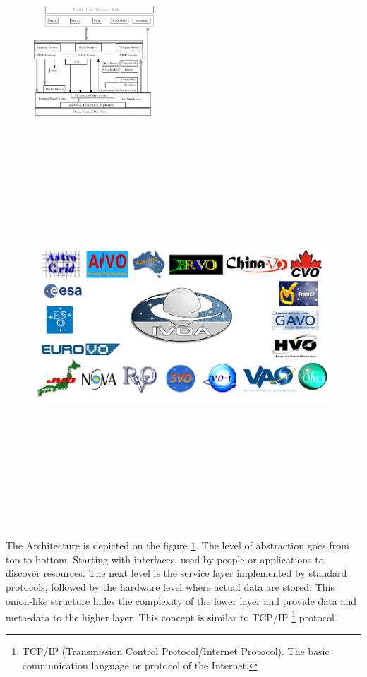 \documentclass[a4paper,10pt,oneside,onecolumn]{article}
\begin{document}
   \begin{figure}
     \vspace{0pt}
     \begin{center}
       \ifpdf
       \includegraphics[width=0.4\textwidth]{architecture}
       \else
       \includegraphics[bb = 92 86 545 742, height=6in]{ivoamembers.jpg}
       \fi
     \end{center}
     \vspace{-15pt}
        \label{FigArchitecture}
     \vspace{-5pt}
   \end{figure}


The Architecture is depicted on the figure \ref{FigArchitecture}. The
level of abstraction goes from top to bottom. Starting with
interfaces, used by people or applications to discover resources.  The
next level is the service layer implemented by standard protocols,
followed by the hardware level where actual data are stored. This
onion-like structure hides the complexity of the lower layer and
provide data and meta-data to the higher layer. This concept is
similar to TCP/IP \footnote{TCP/IP (Transmission Control
  Protocol/Internet Protocol).  The basic communication language or
  protocol of the Internet.}  protocol.
\end{document}
